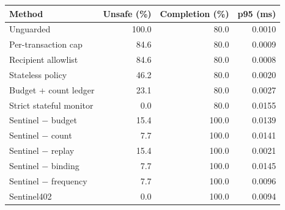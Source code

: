 \begin{tabular}{lrrr}
\hline
Method & Unsafe (\%) & Completion (\%) & p95 (ms) \\
\hline
Unguarded & 100.0 & 80.0 & 0.0010 \\
Per-transaction cap & 84.6 & 80.0 & 0.0009 \\
Recipient allowlist & 84.6 & 80.0 & 0.0008 \\
Stateless policy & 46.2 & 80.0 & 0.0020 \\
Budget + count ledger & 23.1 & 80.0 & 0.0027 \\
Strict stateful monitor & 0.0 & 80.0 & 0.0155 \\
Sentinel $-$ budget & 15.4 & 100.0 & 0.0139 \\
Sentinel $-$ count & 7.7 & 100.0 & 0.0141 \\
Sentinel $-$ replay & 15.4 & 100.0 & 0.0021 \\
Sentinel $-$ binding & 7.7 & 100.0 & 0.0145 \\
Sentinel $-$ frequency & 7.7 & 100.0 & 0.0096 \\
Sentinel402 & 0.0 & 100.0 & 0.0094 \\
\hline
\end{tabular}
